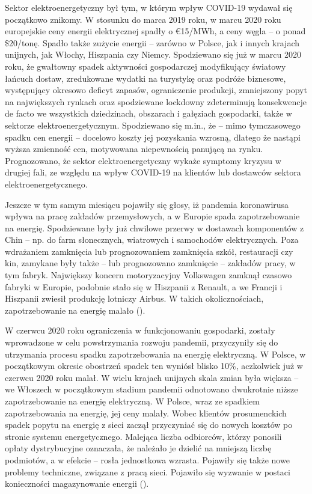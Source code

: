 \documentclass[polish, twoside, 12pt, a4paper]{article}
\theoremstyle{definition}
\theoremstyle{plain}
\theoremstyle{remark}
\begin{document}
Sektor elektroenergetyczny był tym, w którym wpływ COVID-19 wydawał się początkowo znikomy. W stosunku do marca 2019 roku, w marcu 2020 roku europejskie ceny energii elektrycznej spadły o €15/MWh, a ceny węgla – o ponad \$20/tonę. Spadło także zużycie energii – zarówno w Polsce, jak i innych krajach unijnych, jak Włochy, Hiszpania czy Niemcy. Spodziewano się już w marcu 2020 roku, że gwałtowny spadek aktywności gospodarczej modyfikujący światowy łańcuch dostaw, zredukowane wydatki na turystykę oraz podróże biznesowe, występujący okresowo deficyt zapasów, ograniczenie produkcji, zmniejszony popyt na największych rynkach oraz spodziewane lockdowny zdeterminują konsekwencje de facto we wszystkich dziedzinach, obszarach i gałęziach gospodarki, także w sektorze elektroenergetycznym. Spodziewano się m.in., że – mimo tymczasowego spadku cen energii – docelowo koszty jej pozyskania wzrosną, dlatego że nastąpi wyższa zmienność cen, motywowana niepewnością panującą na rynku. Prognozowano, że sektor elektroenergetyczny wykaże symptomy kryzysu w drugiej fali, ze względu na wpływ COVID-19 na klientów lub dostawców sektora elektroenergetycznego. %

Jeszcze w tym samym miesiącu pojawiły się głosy, iż pandemia koronawirusa wpływa na pracę zakładów przemysłowych, a w Europie spada zapotrzebowanie na energię. Spodziewane były już chwilowe przerwy w dostawach komponentów z Chin – np. do farm słonecznych, wiatrowych i samochodów elektrycznych. Poza wdrażaniem zamknięcia lub prognozowaniem zamknięcia szkół, restauracji czy kin, zamykane były także – lub prognozowano zamknięcie – zakładów pracy, w tym fabryk. Największy koncern motoryzacyjny Volkswagen zamknął czasowo fabryki w Europie, podobnie stało się w Hiszpanii z Renault, a we Francji i Hiszpanii zwiesił produkcję lotniczy Airbus. W takich okolicznościach, zapotrzebowanie na energię malało (\cite{wysokienapiecie2023}). 

W czerwcu 2020 roku ograniczenia w funkcjonowaniu gospodarki, zostały wprowadzone w celu powstrzymania rozwoju pandemii, przyczyniły się do utrzymania procesu spadku zapotrzebowania na energię elektryczną. W Polsce, w początkowym okresie obostrzeń spadek ten wyniósł blisko 10\%, aczkolwiek już w czerwcu 2020 roku malał. W wielu krajach unijnych skala zmian była większa – we Włoszech w początkowym stadium pandemii odnotowano dwukrotnie niższe zapotrzebowanie na energię elektryczną. W Polsce, wraz ze spadkiem zapotrzebowania na energię, jej ceny malały. Wobec klientów prosumenckich spadek popytu na energię z sieci zaczął przyczyniać się do nowych kosztów po stronie systemu energetycznego. Malejąca liczba odbiorców, którzy ponosili opłaty dystrybucyjne oznaczała, że należało je dzielić na mniejszą liczbę podmiotów, a w efekcie – rosła jednostkowa wzrasta. Pojawiły się także nowe problemy techniczne, związane z pracą sieci. Pojawiło się wyzwanie w postaci konieczności magazynowanie energii (\cite{ure2023}).
\end{document}
